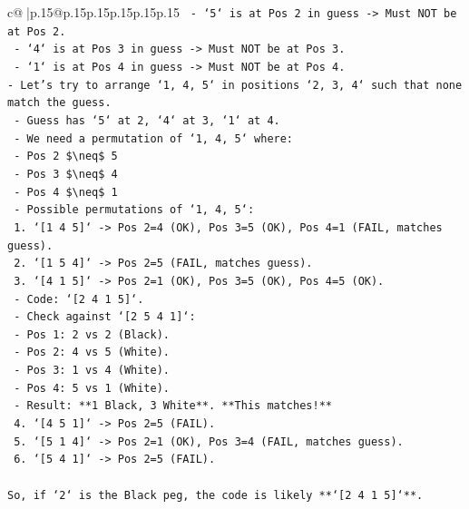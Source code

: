 \documentclass{article}
\begin{document}
{\begin{supertabular}{c@{$\;$}|p{.15\linewidth}@{}p{.15\linewidth}p{.15\linewidth}p{.15\linewidth}p{.15\linewidth}p{.15\linewidth}}
{{{\texttt{    {-} `5` is at Pos 2 in guess {-}> Must NOT be at Pos 2.} \\
\texttt{    {-} `4` is at Pos 3 in guess {-}> Must NOT be at Pos 3.} \\
\texttt{    {-} `1` is at Pos 4 in guess {-}> Must NOT be at Pos 4.} \\
\texttt{{-} Let's try to arrange `1, 4, 5` in positions `2, 3, 4` such that none match the guess.} \\
\texttt{    {-} Guess has `5` at 2, `4` at 3, `1` at 4.} \\
\texttt{    {-} We need a permutation of `1, 4, 5` where:} \\
\texttt{        {-} Pos 2 \$\textbackslash{}neq\$ 5} \\
\texttt{        {-} Pos 3 \$\textbackslash{}neq\$ 4} \\
\texttt{        {-} Pos 4 \$\textbackslash{}neq\$ 1} \\
\texttt{    {-} Possible permutations of `1, 4, 5`:} \\
\texttt{        1. `{[}1 4 5{]}` {-}> Pos 2=4 (OK), Pos 3=5 (OK), Pos 4=1 (FAIL, matches guess).} \\
\texttt{        2. `{[}1 5 4{]}` {-}> Pos 2=5 (FAIL, matches guess).} \\
\texttt{        3. `{[}4 1 5{]}` {-}> Pos 2=1 (OK), Pos 3=5 (OK), Pos 4=5 (OK).} \\
\texttt{           {-} Code: `{[}2 4 1 5{]}`.} \\
\texttt{           {-} Check against `{[}2 5 4 1{]}`:} \\
\texttt{             {-} Pos 1: 2 vs 2 (Black).} \\
\texttt{             {-} Pos 2: 4 vs 5 (White).} \\
\texttt{             {-} Pos 3: 1 vs 4 (White).} \\
\texttt{             {-} Pos 4: 5 vs 1 (White).} \\
\texttt{             {-} Result: **1 Black, 3 White**. **This matches!**} \\
\texttt{        4. `{[}4 5 1{]}` {-}> Pos 2=5 (FAIL).} \\
\texttt{        5. `{[}5 1 4{]}` {-}> Pos 2=1 (OK), Pos 3=4 (FAIL, matches guess).} \\
\texttt{        6. `{[}5 4 1{]}` {-}> Pos 2=5 (FAIL).} \\
\\ 
\texttt{So, if `2` is the Black peg, the code is likely **`{[}2 4 1 5{]}`**.} \\
}}}
\end{supertabular}}
\end{document}

